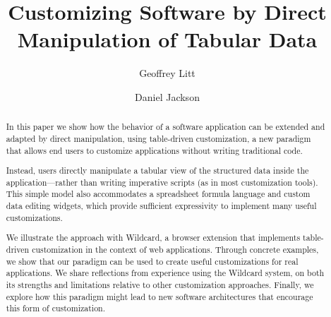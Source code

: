 \documentclass[sigplan,screen,10pt,anonymous,review]{acmart}
\begin{document}
\title{Customizing Software by Direct Manipulation of Tabular Data}


\author{Geoffrey Litt}

\author{Daniel Jackson}


\begin{abstract}
  In this paper we show how the behavior of a software application can
  be extended and adapted by direct manipulation, using table-driven
  customization, a new paradigm that allows end users to customize
  applications without writing traditional code.

  Instead, users directly manipulate a tabular view of the structured
  data inside the application---rather than writing imperative scripts
  (as in most customization tools). This simple model also accommodates
  a spreadsheet formula language and custom data editing widgets, which
  provide sufficient expressivity to implement many useful
  customizations.

  We illustrate the approach with Wildcard, a browser extension that
  implements table-driven customization in the context of web
  applications. Through concrete examples, we show that our paradigm can
  be used to create useful customizations for real applications. We
  share reflections from experience using the Wildcard system, on both
  its strengths and limitations relative to other customization
  approaches. Finally, we explore how this paradigm might lead to new
  software architectures that encourage this form of customization.
\end{abstract}
\end{document}
